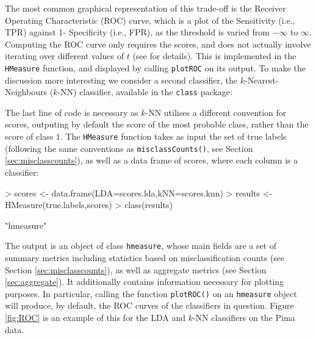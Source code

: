 \documentclass{article}
\begin{document}
The most common graphical representation of this trade-off is the Receiver Operating Characteristic (ROC) curve, which is a plot of the Sensitivity (i.e., TPR) against  1- Specificity (i.e., FPR), as the threshold is varied from $-\infty$ to $\infty$. Computing the ROC curve only requires the scores, and does not actually involve iterating over different values of $t$ (see \cite{hand2009} for details). This is implemented in the \verb+HMeasure+ function, and displayed by calling \verb+plotROC+ on its output. To make the discussion more interesting we consider a second classifier, the $k$-Nearest-Neighbours ($k$-NN) classifier, available in the \verb+class+ package:
\begin{Schunk}
\end{Schunk}
The last line of code is necessary as $k$-NN utilises a different convention for scores, outputing by default the score of the most probable class, rather than the score of class $1$. The \verb+HMeasure+ function takes as input the set of true labels (following the same conventions as \verb+misclassCounts()+, see Section \ref{sec:misclasscounts}), as well as a data frame of scores, where each column is a classifier:
\begin{Schunk}
\begin{Sinput}
> scores <- data.frame(LDA=scores.lda,kNN=scores.knn)
> results <- HMeasure(true.labels,scores)
> class(results)
\end{Sinput}
\begin{Soutput}
[1] "hmeasure"
\end{Soutput}
\end{Schunk}
The output is an object of class \verb+hmeasure+, whose main fields are a set of summary metrics including statistics based on misclassification counts (see Section \ref{sec:misclasscounts}), as well as aggregate metrics (see Section \ref{sec:aggregate}). It additionally contains information necessary for plotting purposes. In particular, calling the function \verb+plotROC()+ on an \verb+hmeasure+ object will produce, by default, the ROC curves of the classifiers in question.  Figure \ref{fig:ROC} is an example of this for the LDA and $k$-NN classifiers on the Pima data.
\end{document}

